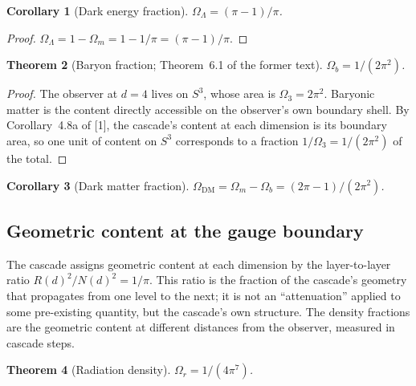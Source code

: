 \documentclass[12pt,a4paper]{article}
\newtheorem{theorem}{Theorem}[section]
\newtheorem{corollary}[theorem]{Corollary}
\theoremstyle{remark}
\begin{document}
\begin{corollary}[Dark energy fraction]\label{cor:omega_l}
$\Omega_\Lambda = (\pi - 1)/\pi$.
\end{corollary}

\begin{proof}
$\Omega_\Lambda = 1 - \Omega_m = 1 - 1/\pi = (\pi - 1)/\pi$.
\end{proof}

\begin{theorem}[Baryon fraction; Theorem~6.1 of the former text]\label{thm:omega_b}
$\Omega_b = 1/(2\pi^2)$.
\end{theorem}

\begin{proof}
The observer at $d = 4$ lives on $S^3$, whose area is $\Omega_3 = 2\pi^2$. Baryonic matter is the content directly accessible on the observer's own boundary shell. By Corollary~4.8a of [1], the cascade's content at each dimension is its boundary area, so one unit of content on $S^3$ corresponds to a fraction $1/\Omega_3 = 1/(2\pi^2)$ of the total.
\end{proof}

\begin{corollary}[Dark matter fraction]
$\Omega_{\mathrm{DM}} = \Omega_m - \Omega_b = (2\pi - 1)/(2\pi^2)$.
\end{corollary}

\subsection{Geometric content at the gauge boundary}

The cascade assigns geometric content at each dimension by the layer-to-layer ratio $R(d)^2/N(d)^2 = 1/\pi$. This ratio is the fraction of the cascade's geometry that propagates from one level to the next; it is not an ``attenuation'' applied to some pre-existing quantity, but the cascade's own structure. The density fractions are the geometric content at different distances from the observer, measured in cascade steps.

\begin{theorem}[Radiation density]\label{thm:omega_r}
$\Omega_r = 1/(4\pi^7)$.
\end{theorem}
\end{document}
